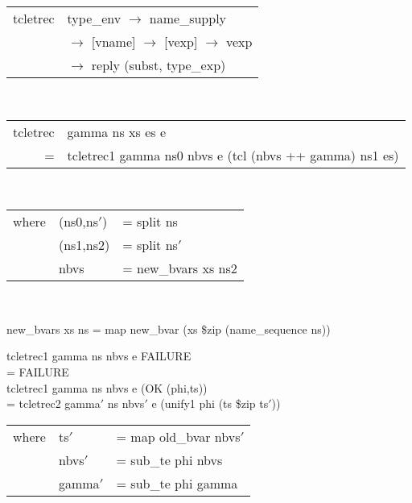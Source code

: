 \begin{mlcoded}
    \begin{tabular}{@{}r@{\hspace{6pt}}l}
        tcletrec \hastype{} &type\_env $\rightarrow$ name\_supply \\
        &$\rightarrow$ [vname] $\rightarrow$ [vexp] $\rightarrow$ vexp \\
        &$\rightarrow$ reply (subst, type\_exp)
    \end{tabular}\\
    \begin{tabular}{@{}r@{\hspace{4pt}}l}
        tcletrec &gamma ns xs es e \\
        = &tcletrec1 gamma ns0 nbvs e (tcl (nbvs ++ gamma) ns1 es) \\
    \end{tabular}\\
    \begin{tabular}{r@{\hspace{4pt}}l@{\hspace{4pt}}l}
    \hspace*{1.25cm}where &(ns0,ns$'$) &= split ns \\
    &(ns1,ns2) &= split ns$'$ \\
    &nbvs &= new\_bvars xs ns2
    \end{tabular}\\
\end{mlcoded}

\begin{mlcoded}
    new\_bvars xs ns = map new\_bvar (xs \$zip (name\_sequence ns))
\end{mlcoded}

\begin{mlcoded}
    tcletrec1 gamma ns nbvs e FAILURE \\
    \hspace*{0.75cm}= FAILURE \\
    tcletrec1 gamma ns nbvs e (OK (phi,ts)) \\
    \hspace*{0.75cm}= tcletrec2 gamma$'$ ns nbvs$'$ e (unify1 phi (ts \$zip ts$'$)) \\
    \begin{tabular}{r@{\hspace{4pt}}l@{\hspace{4pt}}l}
        \hspace*{1cm}where &ts$'$   &= map old\_bvar nbvs$'$ \\
        &nbvs$'$ &= sub\_te phi nbvs \\
        &gamma$'$ &= sub\_te phi gamma
    \end{tabular}
\end{mlcoded}

